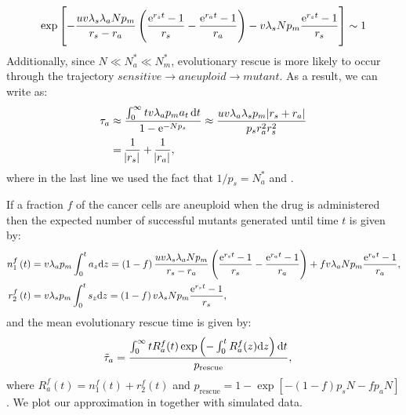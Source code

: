 \documentclass[12pt]{extarticle}
\renewcommand{\d}[1]{\ensuremath{\operatorname{d}\!{#1}}}
\renewcommand{\d}{{\rm d}}
\newcommand{\e}{{\rm e}}
\newcommand{\presc}{p_\text{rescue}}
\renewcommand{\Delta}{r}
\begin{document}
\begin{appendices}
\begin{equation*}
\exp\left[-\frac{uv\lambda_s\lambda_aNp_m}{\Delta_s-\Delta_a}\left(\frac{\e^{\Delta_s t}-1}{\Delta_s}-\frac{\e^{\Delta_a t}-1}{\Delta_a}\right)-v\lambda_sNp_m\frac{\e^{\Delta_s t}-1}{\Delta_s}\right] \sim 1
\end{equation*}
Additionally, since $N\ll N_a^*\ll N_m^*$, evolutionary rescue is more likely to occur through the trajectory $sensitive \rightarrow aneuploid \rightarrow mutant$. As a result, we can write  as:
\begin{align}\nonumber
\tau_a&\approx\frac{\int_0^\infty t v\lambda_ap_ma_t \,\d t}{1-\e^{-Np_s}}\approx\frac{uv\lambda_a\lambda_sp_m\abs{\Delta_s+\Delta_a}}{p_s\Delta_a^2\Delta_s^2}\\ \label{limitapprox4} %
&=\frac{1}{\abs{\Delta_s}}+\frac{1}{\abs{\Delta_a}},
\end{align} %
where in the last line we used the fact that $1/p_s=N_a^*$ and . %

If a fraction $f$ of the cancer cells are aneuploid when the drug is administered then the expected number of successful mutants generated until time $t$ is given by: %
\begin{align*}
n_1^f\left(t\right)&=v\lambda_ap_m\int_0^ta_{z} \d z = \left(1-f\right)\frac{uv\lambda_s\lambda_aNp_m}{\Delta_s-\Delta_a}\left(\frac{\e^{\Delta_st}-1}{\Delta_s}-\frac{\e^{\Delta_at}-1}{\Delta_a}\right)+fv\lambda_aNp_m\frac{\e^{\Delta_a t}-1}{\Delta_a},\\ 
r_2^f\left(t\right)&=v\lambda_sp_m\int_0^ts_{z} \d z = \left(1-f\right)v\lambda_sNp_m\frac{\e^{\Delta_s t}-1}{\Delta_s},
\end{align*} 
and the mean evolutionary rescue time is given by:
\begin{align}\label{meantimet2SGV}
\tilde{\tau}_a&= \frac{\int_{0}^{\infty}{tR_a^f(t)\exp\left(-\int_0^{t}{R_a^f(z)\d z}\right) \d t}}{\presc},
\end{align}
where $R_a^f(t)=n_1^f\left(t\right)+r_2^f\left(t\right)$ and $\presc = 1-\exp\left[-\left(1-f\right)p_sN-fp_aN\right]$. We plot our approximation in   together with simulated data.


\end{appendices}
\end{document}
